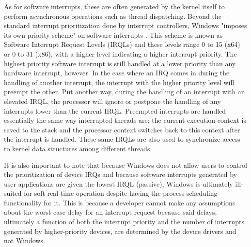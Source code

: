 \documentclass[onecolumn, draftclsnofoot,10pt, compsoc]{IEEEtran}
\begin{document}
As for software interrupts, these are often generated by the kernel itself to perform asynchronous operations such as thread dispatching. Beyond the standard interrupt prioritization done by interrupt controllers, Windows "imposes its own priority scheme" on software interrupts \cite{WindowsInternals}. This scheme is known as Software Interrupt Request Levels (IRQLs) and these levels range 0 to 15 (x64) or 0 to 31 (x86), with a higher level indicating a higher interrupt priority. The highest priority software interrupt is still handled at a lower priority than any hardware interrupt, however. In the case where an IRQ comes in during the handling of another interrupt, the interrupt with the higher priority level will preempt the other. Put another way, during the handling of an interrupt with an elevated IRQL, the processor will ignore or postpone the handling of any interrupts lower than the current IRQL. Preempted interrupts are handled essentially the same way interrupted threads are; the current execution context is saved to the stack and the processor context switches back to this context after the interrupt is handled. These same IRQLs are also used to synchronize access to kernel data structures among different threads.

It is also important to note that because Windows does not allow users to control the prioritization of device IRQs and because software interrupts generated by user applications are given the lowest IRQL (passive), Windows is ultimately ill-suited for soft real-time operation despite having the process scheduling functionality for it. This is because a developer cannot make any assumptions about the worst-case delay for an interrupt request because said delays, ultimately a function of both the interrupt priority and the number of interrupts generated by higher-priority devices, are determined by the device drivers and not Windows.
\end{document}
